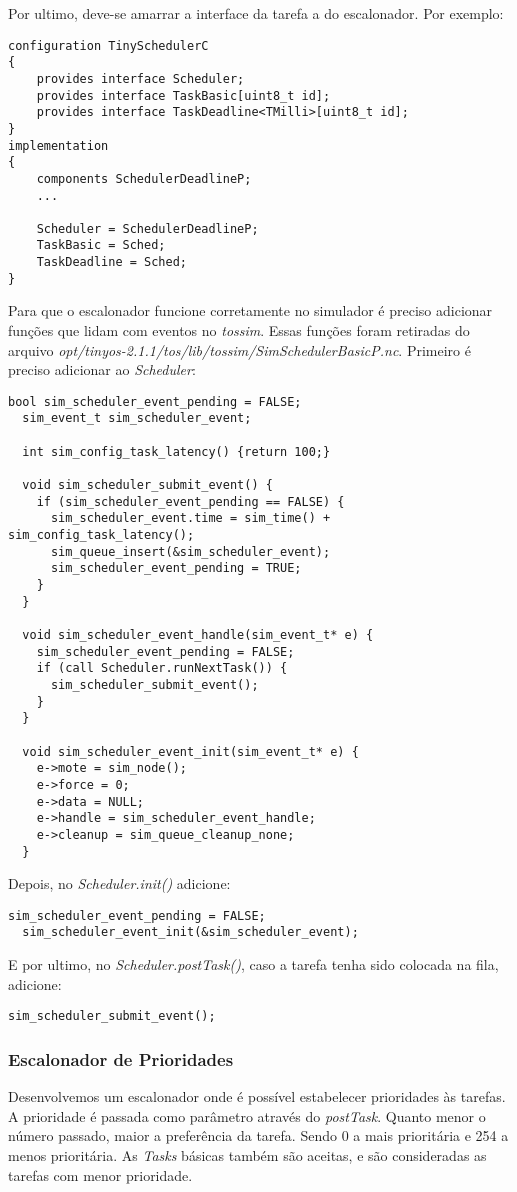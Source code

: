 \documentclass[a4paper,onecolumn, 10pt]{article}
\begin{document}
Por ultimo, deve-se amarrar a interface da tarefa a do escalonador. Por exemplo:
\begin{lstlisting}
configuration TinySchedulerC 
{
    provides interface Scheduler;
    provides interface TaskBasic[uint8_t id];
    provides interface TaskDeadline<TMilli>[uint8_t id];
}
implementation 
{
    components SchedulerDeadlineP;
    ...

    Scheduler = SchedulerDeadlineP;
    TaskBasic = Sched;
    TaskDeadline = Sched;
}
\end{lstlisting}

Para que o escalonador funcione corretamente no simulador é preciso adicionar funções que lidam com eventos no
\textit{tossim}. Essas funções foram retiradas do arquivo
\textit{opt/tinyos-2.1.1/tos/lib/tossim/SimSchedulerBasicP.nc}.
Primeiro é preciso adicionar ao \textit{Scheduler}:
\begin{lstlisting}[frame=single]
  bool sim_scheduler_event_pending = FALSE;
  sim_event_t sim_scheduler_event;

  int sim_config_task_latency() {return 100;}
  
  void sim_scheduler_submit_event() {
    if (sim_scheduler_event_pending == FALSE) {
      sim_scheduler_event.time = sim_time() + sim_config_task_latency();
      sim_queue_insert(&sim_scheduler_event);
      sim_scheduler_event_pending = TRUE;
    }
  }

  void sim_scheduler_event_handle(sim_event_t* e) {
    sim_scheduler_event_pending = FALSE;
    if (call Scheduler.runNextTask()) {
      sim_scheduler_submit_event();
    }
  }

  void sim_scheduler_event_init(sim_event_t* e) {
    e->mote = sim_node();
    e->force = 0;
    e->data = NULL;
    e->handle = sim_scheduler_event_handle;
    e->cleanup = sim_queue_cleanup_none;
  }
\end{lstlisting}
Depois, no \textit{Scheduler.init()} adicione:
\begin{lstlisting}[frame=single]
  sim_scheduler_event_pending = FALSE;
  sim_scheduler_event_init(&sim_scheduler_event);
\end{lstlisting}
E por ultimo, no \textit{Scheduler.postTask()}, caso a tarefa tenha sido colocada na fila, adicione:
\begin{lstlisting}[frame=single]
  sim_scheduler_submit_event();
\end{lstlisting}

\subsubsection{Escalonador de Prioridades}\label{escalonadorprioridades}
Desenvolvemos um escalonador onde é possível estabelecer prioridades às tarefas. A prioridade é passada como parâmetro através 
do \textit{postTask}. Quanto menor o número passado, maior a preferência da tarefa. Sendo 0 a
mais prioritária e 254 a menos prioritária.
As \textit{Tasks} básicas também são aceitas, e são consideradas as tarefas com menor prioridade.
\end{document}
